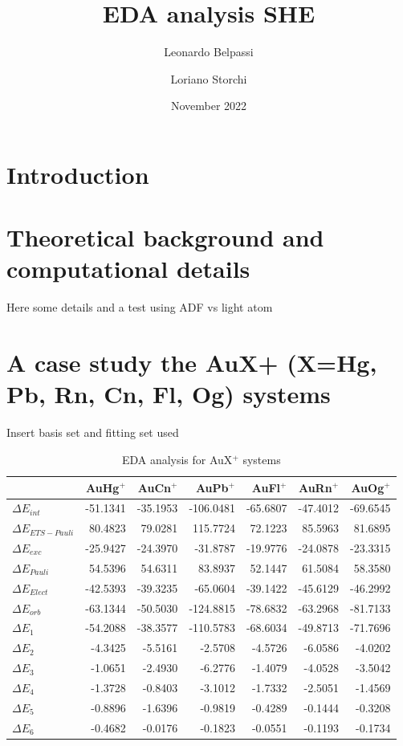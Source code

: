 \documentclass[journal=inoraj,manuscript=article]{achemso}
\title{EDA analysis SHE}
\author{Leonardo Belpassi}
\author{Loriano Storchi}
\date{November 2022}
\begin{document}
\maketitle

\section{Introduction}

\section{Theoretical background and computational details}

Here some details and a test using ADF vs light atom

\section{A case study the AuX+ (X=Hg, Pb, Rn, Cn, Fl, Og) systems  }

Insert basis set and fitting set used 

\begin{table}[!h]
\begin{tabular}{lrrrrrr}
\hline
                       & AuHg$^+$ & AuCn$^+$ & AuPb$^+$  & AuFl$^+$ & AuRn$^+$ & AuOg$^+$ \\ \hline
\hline
$\Delta E_{int}$       & -51.1341 & -35.1953 & -106.0481 & -65.6807 & -47.4012 & -69.6545 \\ \hline
$\Delta E_{ETS-Pauli}$ &  80.4823 &  79.0281 &  115.7724 &  72.1223 &  85.5963 &  81.6895 \\ \hline
$\Delta E_{exc}$       & -25.9427 & -24.3970 &  -31.8787 & -19.9776 & -24.0878 & -23.3315 \\ \hline
$\Delta E_{Pauli}$     &  54.5396 &  54.6311 &   83.8937 &  52.1447 &  61.5084 &  58.3580 \\ \hline
$\Delta E_{Elect}$     & -42.5393 & -39.3235 &  -65.0604 & -39.1422 & -45.6129 & -46.2992 \\ \hline
$\Delta E_{orb}$       & -63.1344 & -50.5030 & -124.8815 & -78.6832 & -63.2968 & -81.7133 \\ \hline
$\Delta E_1$           & -54.2088 & -38.3577 & -110.5783 & -68.6034 & -49.8713 & -71.7696 \\ \hline
$\Delta E_2$           &  -4.3425 &  -5.5161 &   -2.5708 &  -4.5726 &  -6.0586 &  -4.0202 \\ \hline
$\Delta E_3$           &  -1.0651 &  -2.4930 &   -6.2776 &  -1.4079 &  -4.0528 &  -3.5042 \\ \hline
$\Delta E_4$           &  -1.3728 &  -0.8403 &   -3.1012 &  -1.7332 &  -2.5051 &  -1.4569 \\ \hline
$\Delta E_5$           &  -0.8896 &  -1.6396 &   -0.9819 &  -0.4289 &  -0.1444 &  -0.3208 \\ \hline
$\Delta E_6$           &  -0.4682 &  -0.0176 &   -0.1823 &  -0.0551 &  -0.1193 &  -0.1734 \\ \hline
\end{tabular}
\caption{EDA analysis for AuX$^+$ systems}
\end{table}
\end{document}
